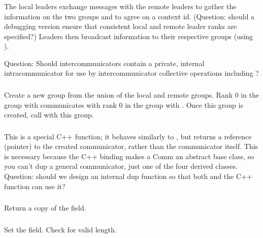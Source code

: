 \documentclass{article}
\begin{document}
\subsubsection{}
The local leaders exchange messages with the remote leaders to gather the
information on the two groups and to agree on a context id.  (Question: should
a debugging version ensure 
that consistent local and remote leader ranks are specified?)  
Leaders then broadcast information to their respective groups (using
). 

Question:  Should intercommunicators contain a private, internal
intracommunicator for use by intercommunicator collective operations including
?

\subsubsection{}
Create a new group from the union of the local and remote groups.  Rank 0 in
the group with  communicates with rank 0 in the group with
.  Once this group is created, call
 with this group.

\subsubsection{}
This is a special C++ function; it behaves similarly to
, but returns a reference (pointer) to the created
communicator, rather than the communicator itself.  This is necessary because
the C++ binding makes a Comm an abstract base class, so you can't dup a
general communicator, just one of the four derived classes.
Question: should we design an internal dup function so that both
 and the C++  function can use it?

\subsubsection{}
Return a copy of the  field.

\subsubsection{}
Set the  field.  Check for valid length.
\end{document}
